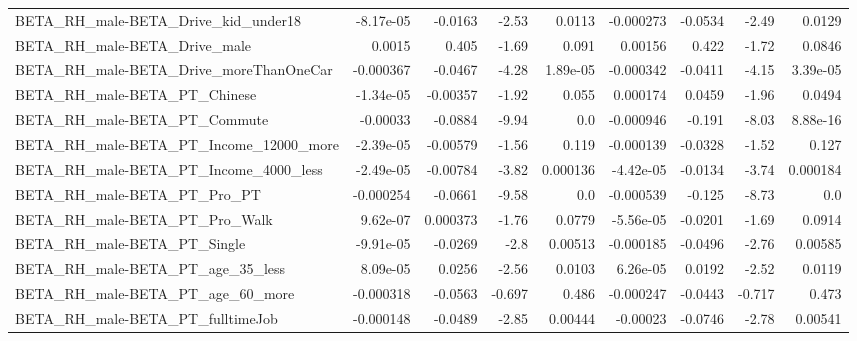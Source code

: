 \begin{tabular}{lrrrrrrrr}
BETA\_RH\_male-BETA\_Drive\_kid\_under18                &   -8.17e-05 &      -0.0163 &     -2.53 &   0.0113 &  -0.000273 &     -0.0534 &        -2.49 &        0.0129 \\
BETA\_RH\_male-BETA\_Drive\_male                       &      0.0015 &        0.405 &     -1.69 &    0.091 &    0.00156 &       0.422 &        -1.72 &        0.0846 \\
BETA\_RH\_male-BETA\_Drive\_moreThanOneCar             &   -0.000367 &      -0.0467 &     -4.28 & 1.89e-05 &  -0.000342 &     -0.0411 &        -4.15 &      3.39e-05 \\
BETA\_RH\_male-BETA\_PT\_Chinese                       &   -1.34e-05 &     -0.00357 &     -1.92 &    0.055 &   0.000174 &      0.0459 &        -1.96 &        0.0494 \\
BETA\_RH\_male-BETA\_PT\_Commute                       &    -0.00033 &      -0.0884 &     -9.94 &      0.0 &  -0.000946 &      -0.191 &        -8.03 &      8.88e-16 \\
BETA\_RH\_male-BETA\_PT\_Income\_12000\_more             &   -2.39e-05 &     -0.00579 &     -1.56 &    0.119 &  -0.000139 &     -0.0328 &        -1.52 &         0.127 \\
BETA\_RH\_male-BETA\_PT\_Income\_4000\_less              &   -2.49e-05 &     -0.00784 &     -3.82 & 0.000136 &  -4.42e-05 &     -0.0134 &        -3.74 &      0.000184 \\
BETA\_RH\_male-BETA\_PT\_Pro\_PT                        &   -0.000254 &      -0.0661 &     -9.58 &      0.0 &  -0.000539 &      -0.125 &        -8.73 &           0.0 \\
BETA\_RH\_male-BETA\_PT\_Pro\_Walk                      &    9.62e-07 &     0.000373 &     -1.76 &   0.0779 &  -5.56e-05 &     -0.0201 &        -1.69 &        0.0914 \\
BETA\_RH\_male-BETA\_PT\_Single                        &   -9.91e-05 &      -0.0269 &      -2.8 &  0.00513 &  -0.000185 &     -0.0496 &        -2.76 &       0.00585 \\
BETA\_RH\_male-BETA\_PT\_age\_35\_less                   &    8.09e-05 &       0.0256 &     -2.56 &   0.0103 &   6.26e-05 &      0.0192 &        -2.52 &        0.0119 \\
BETA\_RH\_male-BETA\_PT\_age\_60\_more                   &   -0.000318 &      -0.0563 &    -0.697 &    0.486 &  -0.000247 &     -0.0443 &       -0.717 &         0.473 \\
BETA\_RH\_male-BETA\_PT\_fulltimeJob                   &   -0.000148 &      -0.0489 &     -2.85 &  0.00444 &   -0.00023 &     -0.0746 &        -2.78 &       0.00541 \\

\end{tabular}
